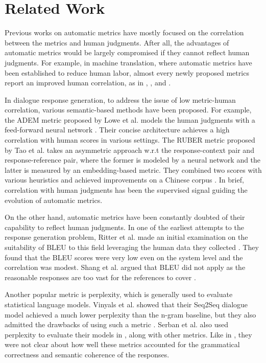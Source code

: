 \documentclass[conference]{IEEEtran}
\begin{document}
\section{Related Work}
Previous works on automatic metrics have mostly focused on the correlation between the metrics and human judgments. After all, the advantages of automatic metrics would be largely compromised if they cannot reflect human judgments. For example, in machine translation, where automatic metrics have been established to reduce human labor, almost every newly proposed metrics report an improved human correlation, as in \cite{NIST}, \cite{METEOR}, and \cite{chrf}.

In dialogue response generation, to address the issue of low metric-human correlation, various semantic-based methods have been proposed. For example, the ADEM metric proposed by Lowe et al. models the human judgments with a feed-forward neural network \cite{ADEM}. Their concise architecture achieves a high correlation with human scores in various settings. The RUBER metric proposed by Tao et al. takes an asymmetric approach w.r.t the response-context pair and response-reference pair, where the former is modeled by a neural network and the latter is measured by an embedding-based metric. They combined two scores with various heuristics and achieved improvements on a Chinese corpus \cite{RUBER}. In brief, correlation with human judgments has been the supervised signal guiding the evolution of automatic metrics.

On the other hand, automatic metrics have been constantly doubted of their capability to reflect human judgments. In one of the earliest attempts to the response generation problem, Ritter et al. made an initial examination on the suitability of BLEU to this field leveraging the human data they collected \cite{Ritter11}. They found that the BLEU scores were very low even on the system level and the correlation was modest. Shang et al. argued that BLEU did not apply as the reasonable responses are too vast for the references to cover \cite{Shang}.

Another popular metric is perplexity, which is generally used to evaluate statistical language models. Vinyals et al. showed that their Seq2Seq dialogue model achieved a much lower perplexity than the n-gram baseline, but they also admitted the drawbacks of using such a metric \cite{GoogleChatbot}. Serban et al. also used perplexity to evaluate their models in \cite{HRED}, along with other metrics. Like in \cite{GoogleChatbot}, they were not clear about how well these metrics accounted for the grammatical correctness and semantic coherence of the responses.
\end{document}
